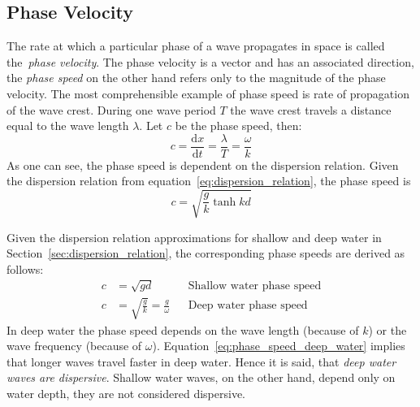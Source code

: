 \subsection{Phase Velocity}
\label{sec:phase_velocity}
The rate at which a particular phase of a wave propagates in space is called the~\emph{phase velocity}.
The phase velocity is a vector and has an associated direction, the \emph{phase speed} on the other hand
refers only to the magnitude of the phase velocity. The most comprehensible example of phase speed
is rate of propagation of the wave crest. During one wave period $T$ the wave crest travels a distance
equal to the wave length $\lambda$. Let $c$ be the phase speed, then:
%
\begin{equation}
 c = \frac{\mathrm dx}{\mathrm dt} = \frac{\lambda}{T} = \frac{\omega}{k}
\end{equation}
%
As one can see, the phase speed is dependent on the dispersion relation. Given the dispersion relation
from equation~\ref{eq:dispersion_relation}, the phase speed is
\begin{equation}
 c = \sqrt{\frac{g}{k}\tanh{kd}}
\end{equation}

Given the dispersion relation
approximations for shallow and deep water in Section~\ref{sec:dispersion_relation}, the corresponding
phase speeds are derived as follows:
%
\begin{align}
 c &= \sqrt{gd} && \text{Shallow water phase speed}\\ \label{eq:phase_speed_shallow_water}
 c &= \sqrt{\frac{g}{k}} = \frac{g}{\omega} && \text{Deep water phase speed} \label{eq:phase_speed_deep_water}
\end{align}
%
In deep water the phase speed depends on the wave length (because of $k$) or the wave frequency (because of $\omega$).
Equation~\ref{eq:phase_speed_deep_water} implies that longer waves travel faster in deep water. Hence it is said, that
\emph{deep water waves are dispersive}. Shallow water waves, on the other hand, depend only on water depth, they are not considered
dispersive.

